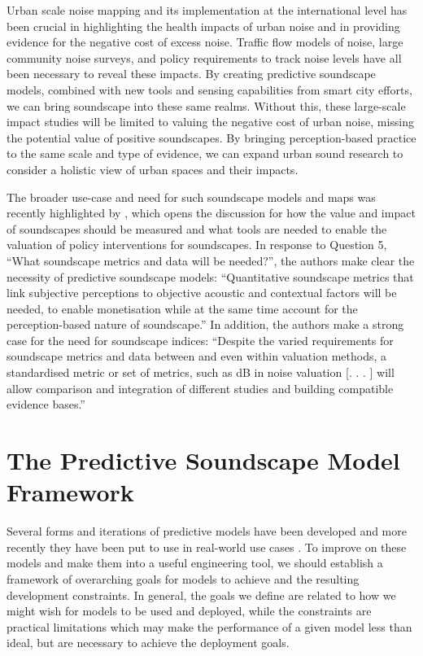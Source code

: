 \documentclass[
  authoryear,
  preprint,
  1p]{elsarticle}
\begin{document}
Urban scale noise mapping and its implementation at the international
level has been crucial in highlighting the health impacts of urban noise
and in providing evidence for the negative cost of excess noise. Traffic
flow models of noise, large community noise surveys, and policy
requirements to track noise levels have all been necessary to reveal
these impacts. By creating predictive soundscape models, combined with
new tools and sensing capabilities from smart city efforts, we can bring
soundscape into these same realms. Without this, these large-scale
impact studies will be limited to valuing the negative cost of urban
noise, missing the potential value of positive soundscapes. By bringing
perception-based practice to the same scale and type of evidence, we can
expand urban sound research to consider a holistic view of urban spaces
and their impacts.

The broader use-case and need for such soundscape models and maps was
recently highlighted by \citet{Jiang2022Ten}, which opens the discussion
for how the value and impact of soundscapes should be measured and what
tools are needed to enable the valuation of policy interventions for
soundscapes. In response to Question 5, ``What soundscape metrics and
data will be needed?'', the authors make clear the necessity of
predictive soundscape models: ``Quantitative soundscape metrics that
link subjective perceptions to objective acoustic and contextual factors
will be needed, to enable monetisation while at the same time account
for the perception-based nature of soundscape.'' In addition, the
authors make a strong case for the need for soundscape indices:
``Despite the varied requirements for soundscape metrics and data
between and even within valuation methods, a standardised metric or set
of metrics, such as dB in noise valuation {[}. . . {]} will allow
comparison and integration of different studies and building compatible
evidence bases.''

\section{The Predictive Soundscape Model
Framework}\label{the-predictive-soundscape-model-framework}

Several forms and iterations of predictive models have been developed
\citep{Lionello2020systematic} and more recently they have been put to
use in real-world use cases
\citep{Mitchell2021Investigating, Watcharasupat2022Autonomous}. To
improve on these models and make them into a useful engineering tool, we
should establish a framework of overarching goals for models to achieve
and the resulting development constraints. In general, the goals we
define are related to how we might wish for models to be used and
deployed, while the constraints are practical limitations which may make
the performance of a given model less than ideal, but are necessary to
achieve the deployment goals.
\end{document}
